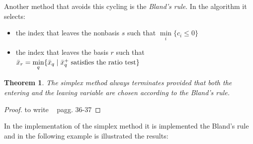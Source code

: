 \documentclass[a4paper,10 pt,titlepage,twoside]{book}
\theoremstyle{plain}
\newtheorem*{theorem*}{Theorem}
\theoremstyle{definition}
\theoremstyle{remark}
\begin{document}
Another method that avoids this cycling is the \textit{Bland's rule}. In the algorithm it selects:
\begin{itemize}
	\item the index that leaves the nonbasis $s$ such that $\min\limits_{i}\{c_{i}\leq0\}$
\item the index that leaves the basis $r$ such that $\bar{x}_{r} = \min\limits_{q}\{\bar{x}_{q}\;|\;\bar{x}_{q}^{+} \text{\;satisfies the ratio test} \}$ \end{itemize} 
\begin{theorem*}
	The simplex method always terminates provided that both the entering and the leaving variable are chosen according to the Bland's rule.
\end{theorem*}
\begin{proof}
to write ~\cite{LP} pagg. 36-37	
\end{proof}
In the implementation of the simplex method it is implemented the Bland's rule and in the following example is illustrated the results:
\end{document}
